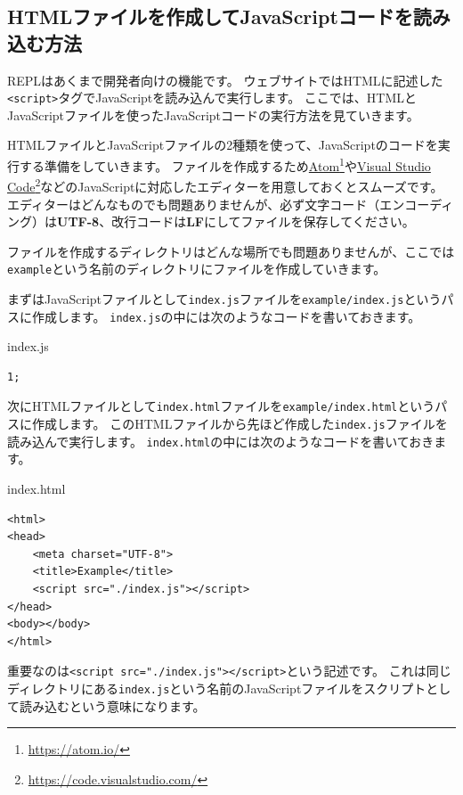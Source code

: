 \hypertarget{js-in-html}{%
\subsection{HTMLファイルを作成してJavaScriptコードを読み込む方法}\label{js-in-html}}

REPLはあくまで開発者向けの機能です。
ウェブサイトではHTMLに記述した\texttt{<script>}タグでJavaScriptを読み込んで実行します。
ここでは、HTMLとJavaScriptファイルを使ったJavaScriptコードの実行方法を見ていきます。

HTMLファイルとJavaScriptファイルの2種類を使って、JavaScriptのコードを実行する準備をしていきます。
ファイルを作成するため\href{https://atom.io/}{Atom}\footnote{\url{https://atom.io/}}や\href{https://code.visualstudio.com/}{Visual
Studio
Code}\footnote{\url{https://code.visualstudio.com/}}などのJavaScriptに対応したエディターを用意しておくとスムーズです。
エディターはどんなものでも問題ありませんが、必ず文字コード（エンコーディング）は\textbf{UTF-8}、改行コードは\textbf{LF}にしてファイルを保存してください。

ファイルを作成するディレクトリはどんな場所でも問題ありませんが、ここでは\texttt{example}という名前のディレクトリにファイルを作成していきます。

まずはJavaScriptファイルとして\texttt{index.js}ファイルを\texttt{example/index.js}というパスに作成します。
\texttt{index.js}の中には次のようなコードを書いておきます。

\begin{listtitle}
index.js
\end{listtitle}
\begin{lstlisting}
1;
\end{lstlisting}
\listend

次にHTMLファイルとして\texttt{index.html}ファイルを\texttt{example/index.html}というパスに作成します。
このHTMLファイルから先ほど作成した\texttt{index.js}ファイルを読み込んで実行します。
\texttt{index.html}の中には次のようなコードを書いておきます。

\begin{listtitle}
index.html
\end{listtitle}
\begin{lstlisting}
<html>
<head>
    <meta charset="UTF-8">
    <title>Example</title>
    <script src="./index.js"></script>
</head>
<body></body>
</html>
\end{lstlisting}
\listend

重要なのは\texttt{<script src="./index.js"></script>}という記述です。
これは同じディレクトリにある\texttt{index.js}という名前のJavaScriptファイルをスクリプトとして読み込むという意味になります。

